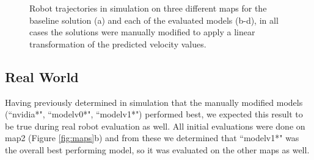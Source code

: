 \documentclass{article}
\begin{document}
\begin{figure}
    \caption{Robot trajectories in simulation on three different maps for the baseline solution (a) and each of the evaluated models (b-d), in all cases the solutions were manually modified to apply a linear transformation of the predicted velocity values.}
  \label{fig:sim_results_modified}
\end{figure}

\subsection{Real World}

Having previously determined in simulation that the manually modified models (``nvidia*", ``modelv0*", ``modelv1*") performed best, we expected this result to be true during real robot evaluation as well. All initial evaluations were done on map2 (Figure \ref{fig:maps}b) and from these we determined that ``modelv1*" was the overall best performing model, so it was evaluated on the other maps as well.
\end{document}

